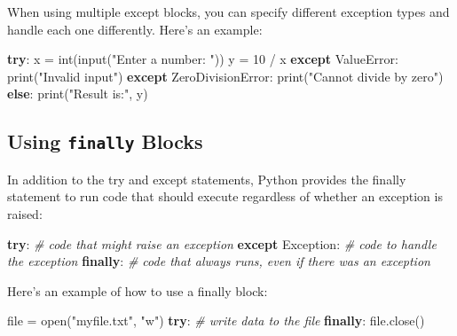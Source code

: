 \documentclass[11pt]{article}
\newenvironment{Shaded}{}{}
\newcommand{\DecValTok}[1]{\textcolor[rgb]{0.25,0.63,0.44}{{#1}}}
\newcommand{\StringTok}[1]{\textcolor[rgb]{0.25,0.44,0.63}{{#1}}}
\newcommand{\CommentTok}[1]{\textcolor[rgb]{0.38,0.63,0.69}{\textit{{#1}}}}
\newcommand{\NormalTok}[1]{{#1}}
\newcommand{\ControlFlowTok}[1]{\textcolor[rgb]{0.00,0.44,0.13}{\textbf{{#1}}}}
\newcommand{\OperatorTok}[1]{\textcolor[rgb]{0.40,0.40,0.40}{{#1}}}
\newcommand{\BuiltInTok}[1]{{#1}}
\newcommand{\PreprocessorTok}[1]{\textcolor[rgb]{0.74,0.48,0.00}{{#1}}}
\begin{document}
When using multiple except blocks, you can specify different exception
types and handle each one differently. Here's an example:

\begin{Shaded}
\begin{Highlighting}[]
\ControlFlowTok{try}\NormalTok{:}
\NormalTok{    x }\OperatorTok{=} \BuiltInTok{int}\NormalTok{(}\BuiltInTok{input}\NormalTok{(}\StringTok{"Enter a number: "}\NormalTok{))}
\NormalTok{    y }\OperatorTok{=} \DecValTok{10} \OperatorTok{/}\NormalTok{ x}
\ControlFlowTok{except} \PreprocessorTok{ValueError}\NormalTok{:}
    \BuiltInTok{print}\NormalTok{(}\StringTok{"Invalid input"}\NormalTok{)}
\ControlFlowTok{except} \PreprocessorTok{ZeroDivisionError}\NormalTok{:}
    \BuiltInTok{print}\NormalTok{(}\StringTok{"Cannot divide by zero"}\NormalTok{)}
\ControlFlowTok{else}\NormalTok{:}
    \BuiltInTok{print}\NormalTok{(}\StringTok{"Result is:"}\NormalTok{, y)}
\end{Highlighting}
\end{Shaded}

\hypertarget{using-finally-blocks}{%
\subsection{\texorpdfstring{Using \texttt{finally}
Blocks}{Using finally Blocks}}\label{using-finally-blocks}}

In addition to the try and except statements, Python provides the
finally statement to run code that should execute regardless of whether
an exception is raised:

\begin{Shaded}
\begin{Highlighting}[]
\ControlFlowTok{try}\NormalTok{:}
    \CommentTok{\# code that might raise an exception}
\ControlFlowTok{except} \PreprocessorTok{Exception}\NormalTok{:}
    \CommentTok{\# code to handle the exception}
\ControlFlowTok{finally}\NormalTok{:}
    \CommentTok{\# code that always runs, even if there was an exception}
\end{Highlighting}
\end{Shaded}

Here's an example of how to use a finally block:

\begin{Shaded}
\begin{Highlighting}[]
\BuiltInTok{file} \OperatorTok{=} \BuiltInTok{open}\NormalTok{(}\StringTok{"myfile.txt"}\NormalTok{, }\StringTok{"w"}\NormalTok{)}
\ControlFlowTok{try}\NormalTok{:}
    \CommentTok{\# write data to the file}
\ControlFlowTok{finally}\NormalTok{:}
    \BuiltInTok{file}\NormalTok{.close()}
\end{Highlighting}
\end{Shaded}
\end{document}
